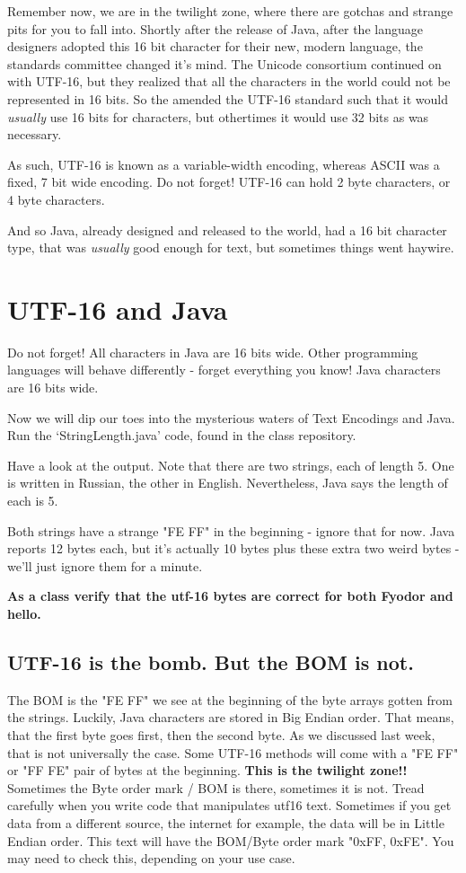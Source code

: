 \documentclass[12pt]{article}
\begin{document}
Remember now, we are in the twilight zone, where there are gotchas and strange pits for you to fall into. Shortly after the release of Java, after the language designers adopted this 16 bit character for their new, modern language, the standards committee changed it's mind. The Unicode consortium continued on with UTF-16, but they realized that all the characters in the world could not be represented in 16 bits. So the amended the UTF-16 standard such that it would \textit{usually} use 16 bits for characters, but othertimes it would use 32 bits as was necessary.

As such, UTF-16 is known as a variable-width encoding, whereas ASCII was a fixed, 7 bit wide encoding. Do not forget! UTF-16 can hold 2 byte characters, or 4 byte characters.

And so Java, already designed and released to the world, had a 16 bit character type, that was \textit{usually} good enough for text, but sometimes things went haywire.

\section{UTF-16 and Java}
Do not forget! All characters in Java are 16 bits wide. Other programming languages will behave differently - forget everything you know! Java characters are 16 bits wide.

Now we will dip our toes into the mysterious waters of Text Encodings and Java. Run the `StringLength.java' code, found in the class repository.

Have a look at the output. Note that there are two strings, each of length 5. One is written in Russian, the other in English. Nevertheless, Java says the length of each is 5. 

Both strings have a strange "FE FF" in the beginning - ignore that for now. Java reports 12 bytes each, but it's actually 10 bytes plus these extra two weird bytes - we'll just ignore them for a minute.

\begin{center}
\textbf{As a class verify that the utf-16 bytes are correct for both Fyodor and hello.}
\end{center}

\subsection{UTF-16 is the bomb. But the BOM is not.}
The BOM is the "FE FF" we see at the beginning of the byte arrays gotten from the strings. Luckily, Java characters are stored in Big Endian order. That means, that the first byte goes first, then the second byte. As we discussed last week, that is not universally the case. Some UTF-16 methods will come with a "FE FF" or "FF FE" pair of bytes at the beginning. \textbf{This is the twilight zone!!} Sometimes the Byte order mark / BOM is there, sometimes it is not. Tread carefully when you write code that manipulates utf16 text. Sometimes if you get data from a different source, the internet for example, the data will be in Little Endian order. This text will have the BOM/Byte order mark "0xFF, 0xFE". You may need to check this, depending on your use case. 
\end{document}
